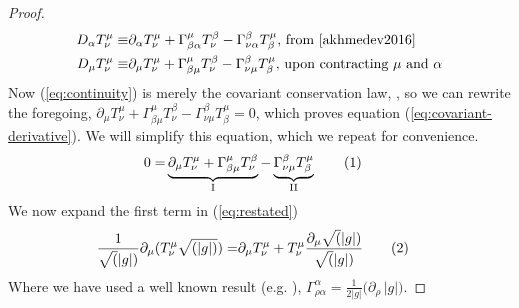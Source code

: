 \documentclass[]{article}
\newcommand\numberthis{\addtocounter{equation}{1}\tag{\theequation}}
\begin{document}
\begin{proof}
	\begin{align*}
	D_{\alpha} T^{\mu}_{\nu} 
	\equiv & \partial_{\alpha} T^{\mu}_{\nu} + \Gamma^{\mu}_{\beta\alpha}T^{\beta}_{\nu}-\Gamma^{\beta}_{\nu\alpha}T^{\mu}_{\beta} \text{, from \cite[(34)]{akhmedev2016}}\\
	D_{\mu} T^{\mu}_{\nu}
	\equiv & \partial_{\mu} T^{\mu}_{\nu} + \Gamma^{\mu}_{\beta\mu}T^{\beta}_{\nu}-\Gamma^{\beta}_{\nu\mu}T^{\mu}_{\beta}\text{, upon contracting $\mu$ and $\alpha$}
	\end{align*}
	Now (\ref{eq:continuity}) is merely the covariant conservation law, \cite[(80)]{akhmedev2016}, so we can rewrite the foregoing,
	$\partial_{\mu} T^{\mu}_{\nu} + \Gamma^{\mu}_{\beta\mu}T^{\beta}_{\nu}-\Gamma^{\beta}_{\nu\mu}T^{\mu}_{\beta}=0$, which proves equation (\ref{eq:covariant-derivative}). We will simplify this equation, which we repeat for convenience.
	\begin{align*}
	0= & \underbrace{\partial_{\mu} T^{\mu}_{\nu} + \Gamma^{\mu}_{\beta\mu}T^{\beta}_{\nu}}_\text{I}-\underbrace{\Gamma^{\beta}_{\nu\mu}T^{\mu}_{\beta}}_\text{II}\numberthis\label{eq:restated}
	\end{align*}
	We now expand the first term in (\ref{eq:restated})
	\begin{align*}
		\frac{1}{\sqrt(|g|)}\partial_{\mu}(T^{\mu}_{\nu}\sqrt{(|g|)}) =&\partial_{\mu}T^{\mu}_{\nu} + T^{\mu}_{\nu}\frac{\partial_{\mu}\sqrt(|g|)}{\sqrt(|g|)} \numberthis\label{eq:term1}
	\end{align*}
	Where we have used a well known result (e.g. \cite[equation (3.11)]{abs1965}), $\Gamma^{\alpha}_{\rho\alpha}=\frac{1}{2|g|}\big(\partial_\rho \, |g|\big)$.
	

\end{proof}
\end{document}
